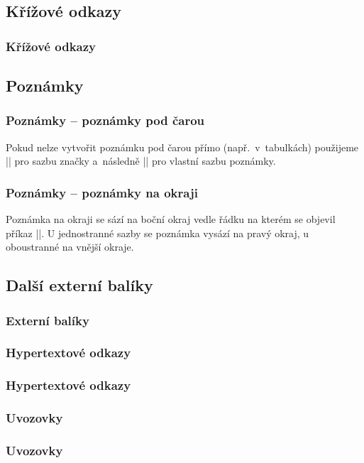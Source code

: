 \subsection{Křížové odkazy}
\begin{frame}
	\frametitle{Křížové odkazy}
	\UnderConstruction
\end{frame}


\subsection{Poznámky}
\begin{frame}[fragile]
	\frametitle{Poznámky -- poznámky pod čarou}
	\begin{remark}
		Pokud nelze vytvořit poznámku pod čarou přímo (např.\ v~tabulkách) použijeme |\footnotemark| pro sazbu značky a~následně || pro vlastní sazbu poznámky.
	\end{remark}
\end{frame}


\begin{frame}[fragile]
	\frametitle{Poznámky -- poznámky na okraji}
	Poznámka na okraji se sází na boční okraj vedle řádku na kterém se objevil příkaz |\marginpar|.
	U jednostranné sazby se poznámka vysází na pravý okraj, u oboustranné na vnější okraje.
\end{frame}


\subsection{Další externí balíky}
\begin{frame}
	\frametitle{Externí balíky}
	\UnderConstruction
\end{frame}


\subsubsection{Hypertextové odkazy}
\begin{frame}
	\frametitle{Hypertextové odkazy}
	\UnderConstruction
\end{frame}


\subsubsection{Uvozovky}
\begin{frame}
	\frametitle{Uvozovky}
	\UnderConstruction
\end{frame}


